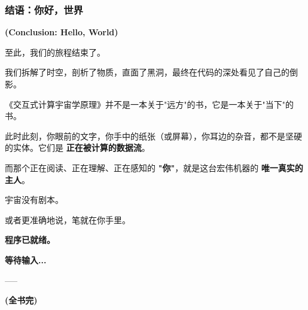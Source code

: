 \subsubsection{结语：你好，世界}

\textbf{(Conclusion: Hello, World)}

至此，我们的旅程结束了。

我们拆解了时空，剖析了物质，直面了黑洞，最终在代码的深处看见了自己的倒影。

《交互式计算宇宙学原理》并不是一本关于"远方"的书，它是一本关于"当下"的书。

此时此刻，你眼前的文字，你手中的纸张（或屏幕），你耳边的杂音，都不是坚硬的实体。它们是 \textbf{正在被计算的数据流}。

而那个正在阅读、正在理解、正在感知的 \textbf{"你"}，就是这台宏伟机器的 \textbf{唯一真实的主人}。

宇宙没有剧本。

或者更准确地说，笔就在你手里。

\textbf{程序已就绪。}

\textbf{等待输入...}

-----

\textbf{(全书完)}

